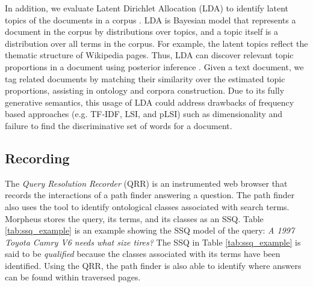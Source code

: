 In addition, we evaluate Latent Dirichlet Allocation (LDA) to identify latent topics of the documents in a corpus \cite{Blei2003latentdirichlet}.  LDA is Bayesian model that represents a document in the corpus by distributions over topics, and a topic itself is a distribution over all  terms in the corpus.  For example, the latent topics reflect the thematic structure of Wikipedia pages. Thus, LDA can discover relevant topic proportions in a document using posterior inference \cite{Blei2003latentdirichlet}. Given a text document, we tag related documents by matching their similarity over the estimated topic proportions, assisting in ontology and corpora construction.  Due to its fully generative semantics, this usage of LDA could address drawbacks of frequency based approaches (e.g. TF-IDF, LSI, and pLSI) such as dimensionality and failure to find the discriminative set of words for a document. %


\subsection{Recording}
\label{sec:query_processing}


The \emph{Query Resolution Recorder} (QRR) is an instrumented web browser that records the interactions of a path finder answering a question. The path finder also uses the tool to identify ontological classes associated with search terms. Morpheus stores the query, its terms, and its classes as an SSQ.  Table \ref{tab:ssq_example} is an example showing the SSQ model of the query: \emph{ A 1997 Toyota Camry V6 needs what size tires?} The SSQ in Table \ref{tab:ssq_example} is said to be \emph{qualified} because the classes associated with its terms have been identified. Using the QRR, the path finder is also able to identify where answers can be found within traversed pages.





\begin{table}[h]
	\caption{Example SSQ model}
	\label{tab:ssq_example}
\end{table}


